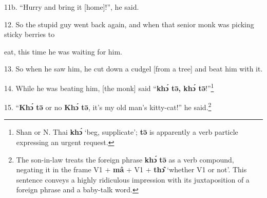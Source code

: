 11b. ``Hurry and bring it [home]!'', he said.

12. So the stupid guy went back again, and when that senior monk was picking sticky
berries to

eat, this time he was waiting for him.

13. So when he saw him, he cut down a cudgel [from a tree] and beat him with it.

14. While he was beating him, [the monk] said ``\textbf{khɔ́ tə̄, khɔ́ tə̄}!''\footnote{Shan or N. Thai \textbf{khɔ́} `beg, supplicate'; \textbf{tə̄} is apparently a verb particle expressing an urgent request.}

15. ``\textbf{Khɔ́ tə̄} or no \textbf{Khɔ́ tə̄}, it's my old man's
kitty-cat!'' he said.\footnote{The son-in-law treats the foreign phrase \textbf{khɔ́} \textbf{tə̄} as a verb compound, negating it in the frame V1 + \textbf{mâ} + V1 + \textbf{thɔ̂} `whether V1 or not'. This sentence conveys a highly ridiculous impression with its juxtaposition of a foreign phrase and a baby-talk word.}

